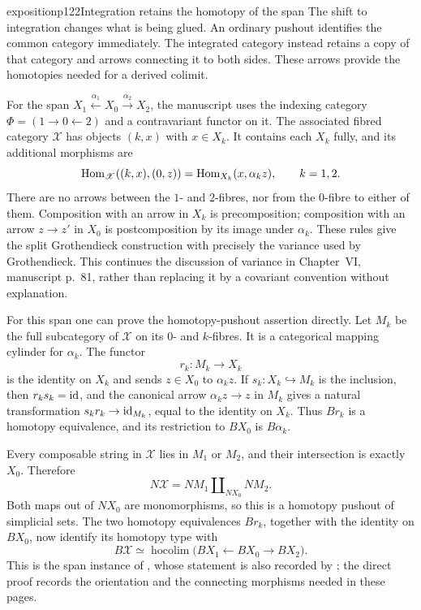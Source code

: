 \begin{dcomment}{exposition}{p122}{Integration retains the homotopy of the span}
The shift to integration changes what is being glued. An ordinary pushout identifies the common category immediately. The integrated category instead retains a copy of that category and arrows connecting it to both sides. These arrows provide the homotopies needed for a derived colimit.

For the span $X_1\xleftarrow{\alpha_1}X_0\xrightarrow{\alpha_2}X_2$, the manuscript uses the indexing category $\Phi=(1\to0\leftarrow2)$ and a contravariant functor on it. The associated fibred category $\mathscr X$ has objects $(k,x)$ with $x\in X_k$. It contains each $X_k$ fully, and its additional morphisms are
\[
 \mathrm{Hom}_{\mathscr X}((k,x),(0,z))
   =\mathrm{Hom}_{X_k}(x,\alpha_kz),\qquad k=1,2.
\]
There are no arrows between the $1$- and $2$-fibres, nor from the $0$-fibre to either of them. Composition with an arrow in $X_k$ is precomposition; composition with an arrow $z\to z'$ in $X_0$ is postcomposition by its image under $\alpha_k$. These rules give the split Grothendieck construction with precisely the variance used by Grothendieck. This continues the discussion of variance in Chapter~VI, manuscript p.~81, rather than replacing it by a covariant convention without explanation.

For this span one can prove the homotopy-pushout assertion directly. Let $M_k$ be the full subcategory of $\mathscr X$ on its $0$- and $k$-fibres. It is a categorical mapping cylinder for $\alpha_k$. The functor
\[
 r_k:M_k\longrightarrow X_k
\]
is the identity on $X_k$ and sends $z\in X_0$ to $\alpha_kz$. If $s_k:X_k\hookrightarrow M_k$ is the inclusion, then $r_ks_k=\mathrm{id}$, and the canonical arrow $\alpha_kz\to z$ in $M_k$ gives a natural transformation $s_kr_k\to\mathrm{id}_{M_k}$, equal to the identity on $X_k$. Thus $Br_k$ is a homotopy equivalence, and its restriction to $BX_0$ is $B\alpha_k$.

Every composable string in $\mathscr X$ lies in $M_1$ or $M_2$, and their intersection is exactly $X_0$. Therefore
\[
 N\mathscr X=NM_1\amalg_{NX_0}NM_2.
\]
Both maps out of $NX_0$ are monomorphisms, so this is a homotopy pushout of simplicial sets. The two homotopy equivalences $Br_k$, together with the identity on $BX_0$, now identify its homotopy type with
\[
 B\mathscr X\simeq
 \operatorname{hocolim}\bigl(BX_1\leftarrow BX_0\to BX_2\bigr).
\]
This is the span instance of \citet[Theorem~1.2]{Thomason1979}, whose statement is also recorded by \citet[Corollary~26.9]{ChacholskiScherer2001}; the direct proof records the orientation and the connecting morphisms needed in these pages.


\end{dcomment}
